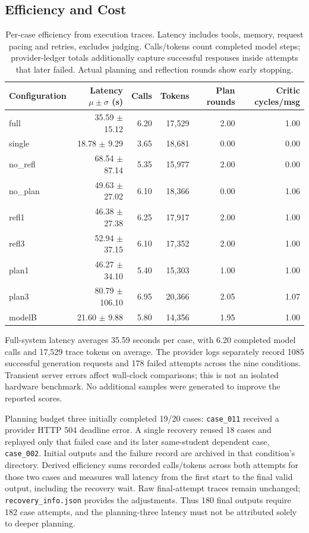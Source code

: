 \documentclass{article}
\begin{document}
\subsection{Efficiency and Cost}
\begin{table}[t]
\caption{Per-case efficiency from execution traces. Latency includes tools, memory, request pacing and retries, excludes judging. Calls/tokens count completed model steps; provider-ledger totals additionally capture successful responses inside attempts that later failed. Actual planning and reflection rounds show early stopping.}
\centering\small
\begin{tabular}{lrrrrr}\toprule
Configuration & Latency $\mu\pm\sigma$ (s) & Calls & Tokens & Plan rounds & Critic cycles/msg\\\midrule
full & 35.59 $\pm$ 15.12 & 6.20 & 17,529 & 2.00 & 1.00 \\
single & 18.78 $\pm$ 9.29 & 3.65 & 18,681 & 0.00 & 0.00 \\
no\_refl & 68.54 $\pm$ 87.14 & 5.35 & 15,977 & 2.00 & 0.00 \\
no\_plan & 49.63 $\pm$ 27.02 & 6.10 & 18,366 & 0.00 & 1.06 \\
refl1 & 46.38 $\pm$ 27.38 & 6.25 & 17,917 & 2.00 & 1.00 \\
refl3 & 52.94 $\pm$ 37.15 & 6.10 & 17,352 & 2.00 & 1.00 \\
plan1 & 46.27 $\pm$ 34.10 & 5.40 & 15,303 & 1.00 & 1.00 \\
plan3 & 80.79 $\pm$ 106.10 & 6.95 & 20,366 & 2.05 & 1.07 \\
modelB & 21.60 $\pm$ 9.88 & 5.80 & 14,356 & 1.95 & 1.00 \\
\bottomrule\end{tabular}
\end{table}
Full-system latency averages 35.59 seconds per case, with 6.20 completed model calls and 17,529 trace tokens on average. The provider logs separately record 1085 successful generation requests and 178 failed attempts across the nine conditions. Transient server errors affect wall-clock comparisons; this is not an isolated hardware benchmark. No additional samples were generated to improve the reported scores.

Planning budget three initially completed 19/20 cases: \texttt{case\_011} received a provider HTTP 504 deadline error. A single recovery reused 18 cases and replayed only that failed case and its later same-student dependent case, \texttt{case\_002}. Initial outputs and the failure record are archived in that condition's directory. Derived efficiency sums recorded calls/tokens across both attempts for those two cases and measures wall latency from the first start to the final valid output, including the recovery wait. Raw final-attempt traces remain unchanged; \texttt{recovery\_info.json} provides the adjustments. Thus 180 final outputs require 182 case attempts, and the planning-three latency must not be attributed solely to deeper planning.
\end{document}
